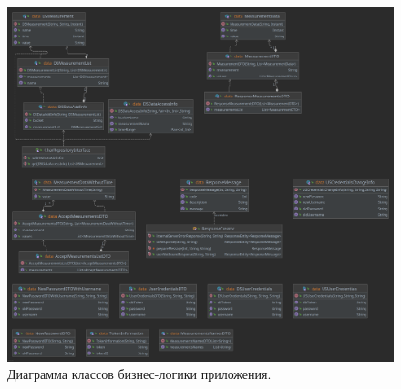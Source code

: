 \begin{figure}[H]
	\centering
	\includegraphics[width=\textwidth]{img/domainLayerDiagram.png}
	\caption{Диаграмма классов бизнес-логики приложения. }
	\label{fig:domainLayer}
\end{figure}

